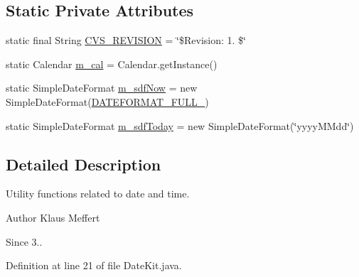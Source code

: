 \subsection*{Static Private Attributes}
\begin{DoxyCompactItemize}
\item 
static final String \hyperlink{classorg_1_1jgap_1_1util_1_1_date_kit_acdc1e2e0a7f960fdfb9506c34068112b}{C\-V\-S\-\_\-\-R\-E\-V\-I\-S\-I\-O\-N} = \char`\"{}\$Revision\-: 1. \$\char`\"{}
\item 
static Calendar \hyperlink{classorg_1_1jgap_1_1util_1_1_date_kit_a2bbecbcb52fcdd64f65e3776361163b5}{m\-\_\-cal} = Calendar.\-get\-Instance()
\item 
static Simple\-Date\-Format \hyperlink{classorg_1_1jgap_1_1util_1_1_date_kit_abd728fab6e51025cd5adb0823ecd7186}{m\-\_\-sdf\-Now} = new Simple\-Date\-Format(\hyperlink{classorg_1_1jgap_1_1util_1_1_date_kit_ab54ce445a14668d8045a3952f2293622}{D\-A\-T\-E\-F\-O\-R\-M\-A\-T\-\_\-\-F\-U\-L\-L\-\_})
\item 
static Simple\-Date\-Format \hyperlink{classorg_1_1jgap_1_1util_1_1_date_kit_a97e98a68f3fdd21c2839de2de65b1f56}{m\-\_\-sdf\-Today} = new Simple\-Date\-Format(\char`\"{}yyyy\-M\-Mdd\char`\"{})
\end{DoxyCompactItemize}


\subsection{Detailed Description}
Utility functions related to date and time.

\begin{DoxyAuthor}{Author}
Klaus Meffert 
\end{DoxyAuthor}
\begin{DoxySince}{Since}
3.. 
\end{DoxySince}


Definition at line 21 of file Date\-Kit.\-java.



